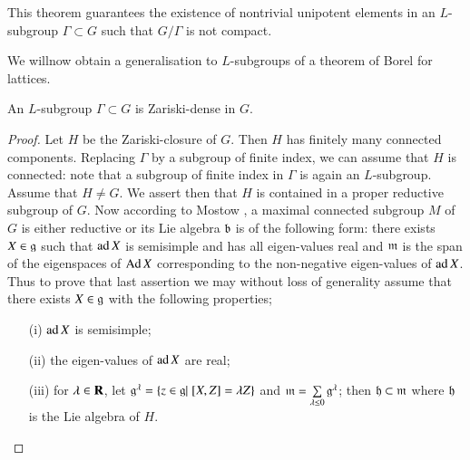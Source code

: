 This theorem guarantees the existence of nontrivial unipotent elements in an $L$-subgroup $\Gamma \subset G$ such that $G/\Gamma$ is not compact.

We will\pageoriginale  now obtain a generalisation to $L$-subgroups of a theorem of Borel for lattices.

\begin{theorem}\label{art9-thm1.8}
An $L$-subgroup $\Gamma \subset G$ is Zariski-dense in $G$.
\end{theorem}

\begin{proof}
Let $H$ be the Zariski-closure of $G$. Then $H$ has finitely many connected components. Replacing $\Gamma$ by a subgroup of finite index, we can assume that $H$ is connected: note that a subgroup of finite index in $\Gamma$ is again an $L$-subgroup. Assume that $H \neq G$. We assert then that $H$ is contained in a proper reductive subgroup of $G$. Now according to Mostow \cite{art9-mostow-1}, a maximal connected subgroup $M$ of $G$ is either reductive or its Lie algebra $\mathfrak{b}$ is of the following form: there exists $X \in \mathfrak{g}$ such that $\operatorname{ad} X$ is semisimple and has all eigen-values real and $\mathfrak{m}$ is the span of the eigenspaces of $\operatorname{Ad} X$ corresponding to the non-negative eigen-values of $\operatorname{ad} X$. Thus to prove that last assertion we may without loss of generality assume that there exists $X \in \mathfrak{g}$ with the following properties;
\begin{itemize}
\item[(i)] $\operatorname{ad} X$ is semisimple;

\item[(ii)] the eigen-values of $\operatorname{ad} X$ are real;

\item[(iii)] for $\lambda \in \mathbf{R}$, let $\mathfrak{g}^\lambda = \{z \in \mathfrak{g} | \; [X, Z] = \lambda Z\}$ and $\mathfrak{m} = \sum\limits_{\lambda \leq 0} \mathfrak{g}^\lambda$; then $\mathfrak{h} \subset \mathfrak{m}$ where $\mathfrak{h}$ is the Lie algebra of $H$.
\end{itemize}


\end{proof}
